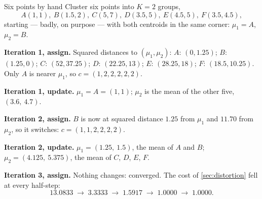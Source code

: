 \begin{workedexample}{Six points by hand}
Cluster six points into $K = 2$ groups,
\[
  A(1,1),\ B(1.5,2),\ C(5,7),\ D(3.5,5),\ E(4.5,5),\ F(3.5,4.5),
\]
starting --- badly, on purpose --- with both centroids in the same corner:
$\mu_1 = A$, $\mu_2 = B$.

\textbf{Iteration 1, assign.} Squared distances to $(\mu_1, \mu_2)$:
$A$: $(0, 1.25)$; $B$: $(1.25, 0)$; $C$: $(52, 37.25)$; $D$: $(22.25, 13)$;
$E$: $(28.25, 18)$; $F$: $(18.5, 10.25)$. Only $A$ is nearer $\mu_1$, so
$c = (1, 2, 2, 2, 2, 2)$.

\textbf{Iteration 1, update.} $\mu_1 = A = (1, 1)$; $\mu_2$ is the mean of the
other five, $(3.6,\ 4.7)$.

\textbf{Iteration 2, assign.} $B$ is now at squared distance $1.25$ from $\mu_1$
and $11.70$ from $\mu_2$, so it switches: $c = (1, 1, 2, 2, 2, 2)$.

\textbf{Iteration 2, update.} $\mu_1 = (1.25,\ 1.5)$, the mean of $A$ and $B$;
$\mu_2 = (4.125,\ 5.375)$, the mean of $C$, $D$, $E$, $F$.

\textbf{Iteration 3, assign.} Nothing changes: converged. The cost of
\cref{sec:distortion} fell at every half-step:
\[
  13.0833 \;\to\; 3.3333 \;\to\; 1.5917 \;\to\; 1.0000 \;\to\; 1.0000 .
\]
\end{workedexample}

